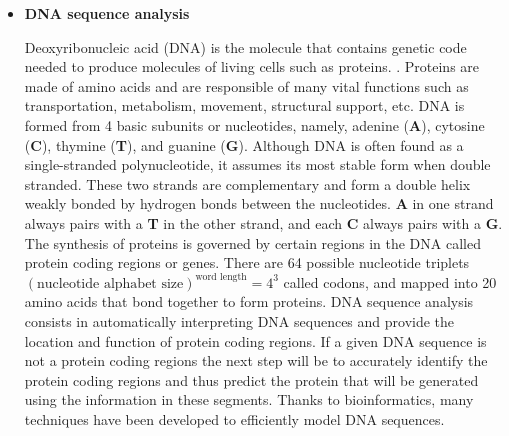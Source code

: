 \documentclass[10pt,twocolumn,letterpaper]{article}
\begin{document}
{\begin{itemize}
      \item \textbf{DNA sequence analysis}
      \par Deoxyribonucleic acid (DNA) is the molecule that contains genetic code needed to produce molecules of living cells such as
       proteins. \cite{krawetz2003introduction}. Proteins are made of amino acids and are responsible of many vital functions such as
        transportation, metabolism, movement, structural support, etc. DNA is formed from 4 basic subunits or nucleotides, namely, adenine
        (\textbf{A}), cytosine (\textbf{C}), thymine (\textbf{T}), and guanine (\textbf{G}). \cite{chakravarthy2004autoregressive} Although
         DNA is often found as a single-stranded polynucleotide, it assumes its most stable form when double stranded. These two strands are complementary
          and form a double helix weakly bonded by hydrogen bonds between the nucleotides. \textbf{A} in one strand always pairs with a \textbf{T} in
           the other strand, and each \textbf{C} always pairs with a \textbf{G}. The synthesis of proteins is governed by certain regions in the DNA called protein coding regions or genes.
            There are 64 possible nucleotide triplets \((\text{nucleotide alphabet size})^{\text{word length}} = 4^3 \) called codons, and mapped into 20 amino acids
             that bond together to form proteins. DNA sequence analysis consists in automatically interpreting DNA sequences and provide the location and function of protein coding regions.
              If a given DNA sequence is not a protein coding regions the next step will be to accurately identify the protein coding regions and thus predict the protein that will be generated
               using the information in these segments. \cite{chakravarthy2004autoregressive} Thanks to bioinformatics, many techniques have been developed to efficiently model DNA sequences.
   

\end{itemize}}
\end{document}
